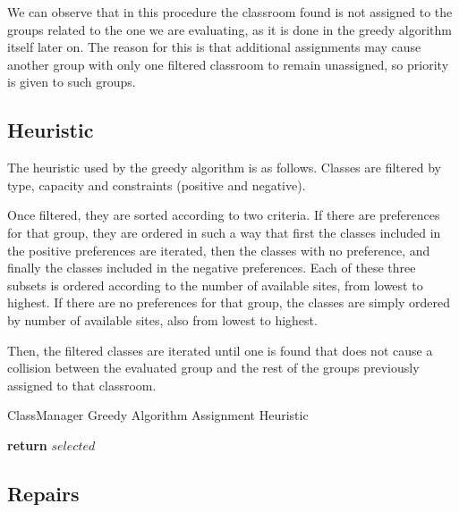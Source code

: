 We can observe that in this procedure the classroom found is not assigned to the groups related to the one we are evaluating, as it is done in the greedy algorithm itself later on. The reason for this is that additional assignments may cause another group with only one filtered classroom to remain unassigned, so priority is given to such groups.


\subsection{Heuristic}

The heuristic used by the greedy algorithm is as follows. Classes are filtered by type, capacity and constraints (positive and negative). 

Once filtered, they are sorted according to two criteria. If there are preferences for that group, they are ordered in such a way that first the classes included in the positive preferences are iterated, then the classes with no preference, and finally the classes included in the negative preferences. Each of these three subsets is ordered according to the number of available sites, from lowest to highest. If there are no preferences for that group, the classes are simply ordered by number of available sites, also from lowest to highest.

Then, the filtered classes are iterated until one is found that does not cause a collision between the evaluated group and the rest of the groups previously assigned to that classroom.

\begin{algorithm}[H]
    \caption{ClassManager Greedy Algorithm Assignment Heuristic}
    \begin{algorithmic}[1]
                 
                \EndIf
            \EndFor
            \State \textbf{return} $selected$
        \EndProcedure
    \end{algorithmic}
\end{algorithm}


\subsection{Repairs}

